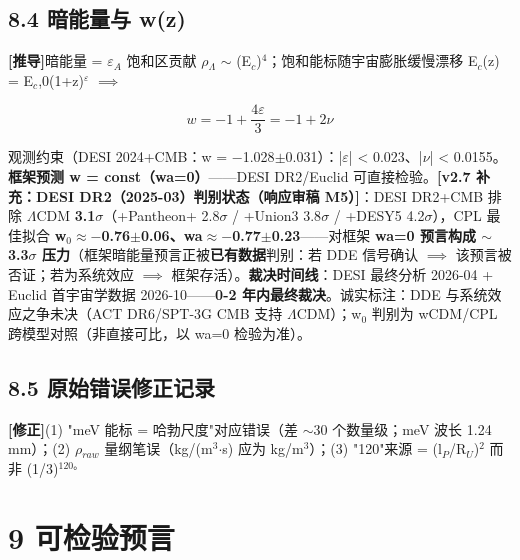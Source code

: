 \documentclass[12pt]{article}
\newcommand{\mtag}[1]{\textbf{[#1]}}
\newcommand{\up}[1]{\ensuremath{^{#1}}}
\newcommand{\down}[1]{\ensuremath{_{#1}}}
\begin{document}
\subsection{8.4 暗能量与 w(z)}

\mtag{推导}暗能量 = \ensuremath{\varepsilon}\down{A} 饱和区贡献 \ensuremath{\rho}\down{\Lambda{}} \ensuremath{\sim} (E\down{c})\up{4}；饱和能标随宇宙膨胀缓慢漂移 E\down{c}(z) = E\down{c},0(1+z)\up{\varepsilon{}} \ensuremath{\implies}

\[w = -1 + \frac{4\varepsilon}{3} = -1 + 2\nu\]

观测约束（DESI 2024+CMB：w = \ensuremath{-}1.028\ensuremath{\pm}0.031）：|\ensuremath{\varepsilon}| < 0.023、|\ensuremath{\nu}| < 0.0155。\textbf{框架预测 w = const（wa=0）}------DESI DR2/Euclid 可直接检验。\textbf{\mtag{v2.7 补充：DESI DR2（2025-03）判别状态（响应审稿 M5）}}：DESI DR2+CMB 排除 \ensuremath{\Lambda}CDM \textbf{3.1\ensuremath{\sigma}}（+Pantheon+ 2.8\ensuremath{\sigma} / +Union3 3.8\ensuremath{\sigma} / +DESY5 4.2\ensuremath{\sigma}），CPL 最佳拟合 \textbf{w\down{0}\ensuremath{\approx}\ensuremath{-}0.76\ensuremath{\pm}0.06、wa\ensuremath{\approx}\ensuremath{-}0.77\ensuremath{\pm}0.23}------对框架 \textbf{wa=0 预言构成 \ensuremath{\sim}3.3\ensuremath{\sigma} 压力}（框架暗能量预言正被\textbf{已有数据}判别：若 DDE 信号确认 \ensuremath{\implies} 该预言被否证；若为系统效应 \ensuremath{\implies} 框架存活）。\textbf{裁决时间线}：DESI 最终分析 2026-04 + Euclid 首宇宙学数据 2026-10------\textbf{0-2 年内最终裁决}。诚实标注：DDE 与系统效应之争未决（ACT DR6/SPT-3G CMB 支持 \ensuremath{\Lambda}CDM）；w\down{0} 判别为 wCDM/CPL 跨模型对照（非直接可比，以 wa=0 检验为准）。

\subsection{8.5 原始错误修正记录}

\mtag{修正}(1) "meV 能标 = 哈勃尺度"对应错误（差 \ensuremath{\sim}30 个数量级；meV 波长 1.24 mm）；(2) \ensuremath{\rho}\down{raw} 量纲笔误（kg/(m\up{3}\ensuremath{\cdot}s) 应为 kg/m\up{3}）；(3) "120"来源 = (l\down{P}/R\down{U})\up{2} 而非 (1/3)\up{120。}



\section{9 可检验预言}
\end{document}
